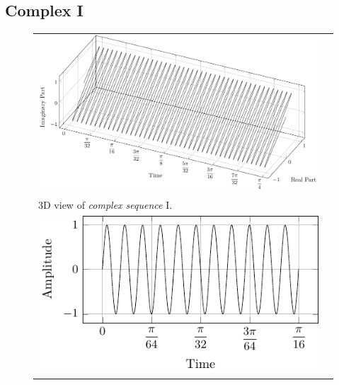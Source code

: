 \documentclass[../../course]{subfiles}
\begin{document}
\subsection{Complex I}

\begin{figure} [H]

    \renewcommand{\arraystretch}{0.75}
    \centering
    \begin{NiceTabularX} {\textwidth} {
            *{2}{>{\centering\arraybackslash}X}
        }

         {
             {
                \includegraphics[height = \textheight] {tikzpics/plotComplexI.pdf}
            }
        }

        &
        \\

         {
            \vbox{
                 {3D view of \emph{complex sequence} I.}
                \label{plt:cmplxI}
            }
        }

        &
        \\

         {
             {
                \includegraphics[height = \textheight] {tikzpics/plotShortX3.pdf}
            }
        }


\end{NiceTabularX}
\end{figure}
\end{document}
